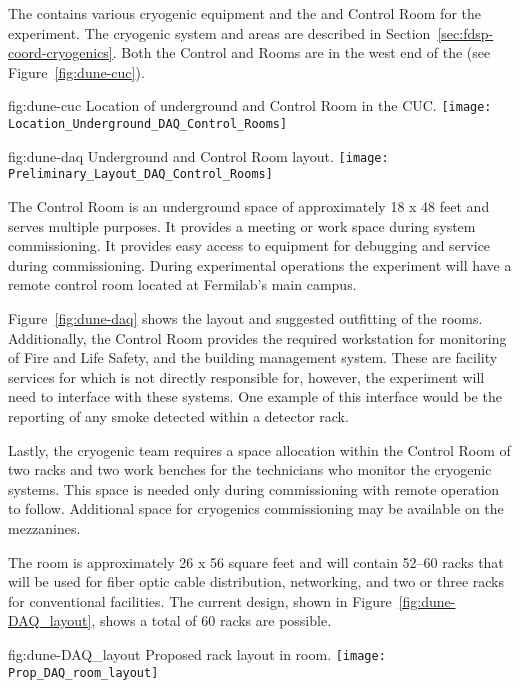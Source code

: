 The  contains various cryogenic equipment and the
 and Control Room for the  experiment.  The
cryogenic system and areas are described in
Section~\ref{sec:fdsp-coord-cryogenics}. Both the Control and 
Rooms are in the west end of the  (see
Figure~\ref{fig:dune-cuc}).
\begin{dunefigure}{fig:dune-cuc}
  {Location of underground  and Control Room in the CUC.}
  \texttt{[image: Location\_Underground\_DAQ\_Control\_Rooms]}
\end{dunefigure}
\begin{dunefigure}{fig:dune-daq}
  {Underground  and Control Room layout.}
  \texttt{[image: Preliminary\_Layout\_DAQ\_Control\_Rooms]}
\end{dunefigure}


The Control Room is an underground space of approximately 18 x 48 feet
and serves multiple purposes.  It provides a meeting or work space
during system commissioning. It provides easy access to 
equipment for debugging and service during commissioning.  During
experimental operations the  experiment will have a remote
control room located at Fermilab's main campus.

Figure~\ref{fig:dune-daq} shows the layout and suggested outfitting of
the rooms. Additionally, the Control Room provides the required
workstation for monitoring of Fire and Life Safety, and the building
management system.  These are facility services for which  is not
directly responsible for, however, the experiment will need to
interface with these systems.  One example of this interface would be
the reporting of any smoke detected within a detector rack.

Lastly, the cryogenic team requires a space allocation within the
Control Room of two racks and two work benches for the technicians who
monitor the cryogenic systems. This space is needed only during
commissioning with remote operation to follow. Additional space for
cryogenics commissioning may be available on the mezzanines.
       
The  room is approximately 26 x 56 square feet and will
contain 52--60 racks that will be used for fiber optic cable
distribution, networking,   and two or three
racks for conventional facilities.  The current design, shown in
Figure~\ref{fig:dune-DAQ_layout}, shows a total of 60 racks are
possible.
\begin{dunefigure}{fig:dune-DAQ_layout}
  {Proposed rack layout in  room.}
  \texttt{[image: Prop\_DAQ\_room\_layout]}
\end{dunefigure}
  

